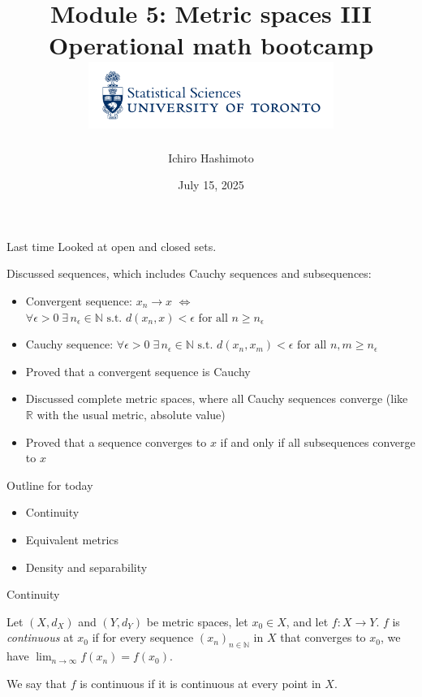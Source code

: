 \documentclass [aspectratio=169]{beamer}
\title[]{Module 5: Metric spaces III \\ {\large Operational math bootcamp}\\ \includegraphics[width=8cm]{dept_logo.png}\vspace{-1em}}
\author[]{Ichiro Hashimoto}
\institute[]{University of Toronto}
\date{July 15, 2025}
\newcommand{\R}{{\mathbb{R}}}
\newcommand{\N}{{\mathbb{N}}}
\begin{document}
{
\begin{frame}
    \titlepage
\end{frame}
}


\begin{frame}{Last time}
Looked at open and closed sets.

\vspace{0.5em}

Discussed sequences, which includes Cauchy sequences and subsequences:
\vspace{0.5em}
	\begin{itemize}
	   \setlength\itemsep{0.6em}
	\item Convergent sequence: $x_n \to x$ $\Leftrightarrow$ $\forall \epsilon > 0 \; \exists \, n_\epsilon \in \N \text{ s.t. } d(x_n,x) < \epsilon \text{ for all } n \geq n_\epsilon$
	\item Cauchy sequence:  $ \forall \epsilon>0 \; \exists \, n_\epsilon \in \N \text{ s.t. } d(x_n,x_m) < \epsilon \text{ for all } n,m \geq n_\epsilon$
	\item Proved that a convergent sequence is Cauchy
	\item Discussed complete metric spaces, where all Cauchy sequences converge (like $\R$ with the usual metric, absolute value)
	\item Proved that a sequence converges to $x$ if and only if all subsequences converge to $x$
    \end{itemize}
\end{frame}

\begin{frame}{Outline for today}
    \begin{itemize}
      \setlength\itemsep{1em}
    	\item Continuity
	\item Equivalent metrics
	\item Density and separability
    \end{itemize}
\end{frame}


\begin{frame}{Continuity}
\begin{definition}
Let $(X,d_X)$ and $(Y,d_Y)$ be metric spaces, let $x_0 \in X$, and let $f:X\to Y$. $f$ is \emph{continuous} at $x_0$ if for every sequence $(x_n)_{n\in\N}$ in $X$ that converges to $x_0$, we have $\lim_{n\to\infty}f(x_n)=f(x_0)$.

\vspace{1em}

We say that $f$ is continuous if it is continuous at every point in $X$.
\end{definition}
\end{frame}
\end{document}
